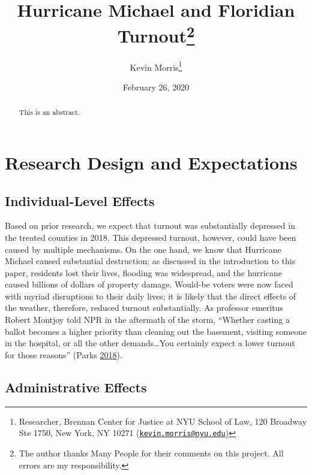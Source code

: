\documentclass[
  12pt,
]{article}
\title{Hurricane Michael and Floridian Turnout\thanks{The author thanks Many People for their comments on this project. All errors are my responsibility.}}
\author{Kevin Morris\footnote{Researcher, Brennan Center for Justice at NYU School of Law, 120 Broadway Ste 1750, New York, NY 10271 (\href{mailto:kevin.morris@nyu.edu}{\nolinkurl{kevin.morris@nyu.edu}})}}
\date{February 26, 2020}
\begin{document}
\maketitle
\begin{abstract}
This is an abstract.
\end{abstract}

\pagebreak


\hypertarget{research-design-and-expectations}{%
\section*{Research Design and Expectations}\label{research-design-and-expectations}}

\hypertarget{individual-level-effects}{%
\subsection*{Individual-Level Effects}\label{individual-level-effects}}

Based on prior research, we expect that turnout was substantially depressed in the treated counties in 2018. This depressed turnout, however, could have been caused by multiple mechanisms. On the one hand, we know that Hurricane Michael caused substantial destruction; as discussed in the introduction to this paper, residents lost their lives, flooding was widespread, and the hurricane caused billions of dollars of property damage. Would-be voters were now faced with myriad disruptions to their daily lives; it is likely that the direct effects of the weather, therefore, reduced turnout substantially. As professor emeritus Robert Montjoy told NPR in the aftermath of the storm, ``Whether casting a ballot becomes a higher priority than cleaning out the basement, visiting someone in the hospital, or all the other demands\ldots You certainly expect a lower turnout for those reasons'' (Parks \protect\hyperlink{ref-Parks2018}{2018}).

\hypertarget{administrative-effects}{%
\subsection*{Administrative Effects}\label{administrative-effects}}
\end{document}
